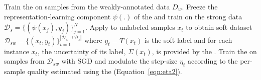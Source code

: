 \setlength{\textfloatsep}{10pt}
\begin{algorithm}[t!]
\algfontsize
\caption{\fwlfull.}%
\begin{algorithmic}[1]
\State Train the \std on samples from the weakly-annotated data $D_w$.
\medskip
\State Freeze the representation-learning component $\psi(.)$ of the \std and train \tch on the strong data $\mathcal{D}_s=\{(\psi(x_j),y_j)\}_{j=1}^{N}$. Apply \tch to unlabeled samples $x_t$ to obtain soft dataset $\mathcal{D}_{sw}=\{(x_t,\bar{y}_t)\}_{t=1}^{|\mathcal{D}_w \cup \mathcal{D}_s|}$ where $\bar{y}_t=T(x_t)$ is the soft label and for each instance $x_t$, the uncertainty of its label, $\Sigma(x_t)$, is provided by the \tch.
\medskip
\State Train the \std on samples from $\mathcal{D}_{sw}$ with SGD and modulate the step-size $\eta_t$ according to the per-sample quality estimated using the \tch (Equation~\ref{eqn:eta2}).
\end{algorithmic}
\label{alg:fwl:main}
\end{algorithm}
